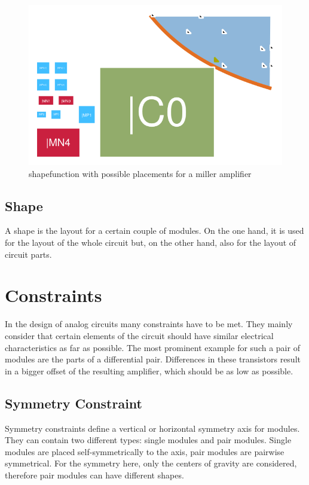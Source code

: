 
\begin{figure}
	\centering
	\includegraphics[scale=1.8]{FIG/shapefunction.png}
	\caption{shapefunction with possible placements for a miller amplifier}
	\label{fig:shapefunction}
\end{figure}

\subsection{Shape}
A shape is the layout for a certain couple of modules. On the one hand, it is used for the layout of the whole circuit but, on the other hand, also for the layout of circuit parts.

\section{Constraints}
In the design of analog circuits many constraints have to be met. They mainly consider that certain elements of the circuit should have similar electrical characteristics as far as possible. The most prominent example for such a pair of modules are the parts of a differential pair. Differences in these transistors result in a bigger offset of the resulting amplifier, which should be as low as possible.

\subsection{Symmetry Constraint}
\label{subsec:symmetry_constraint}
Symmetry constraints define a vertical or horizontal symmetry axis for modules. They can contain two different types: single modules and pair modules. Single modules are placed self-symmetrically to the axis, pair modules are pairwise symmetrical. For the symmetry here, only the centers of gravity are considered, therefore pair modules can have different shapes. 

